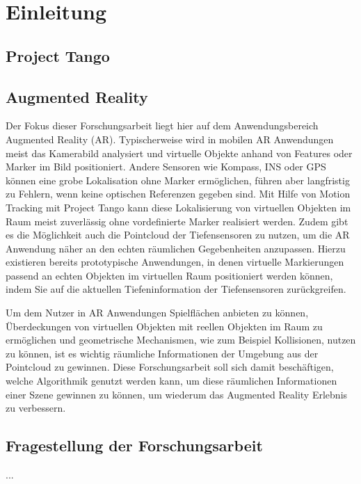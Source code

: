 \chapter{Einleitung}

\section{Project Tango}  \label{sec:project_tango}



\section{Augmented Reality}

Der Fokus dieser Forschungsarbeit liegt hier auf dem Anwendungsbereich Augmented Reality (AR). Typischerweise wird in mobilen AR Anwendungen meist das Kamerabild analysiert und virtuelle Objekte anhand von Features oder Marker im Bild positioniert. Andere Sensoren wie Kompass, INS oder GPS können eine grobe Lokalisation ohne Marker ermöglichen, führen aber langfristig zu Fehlern, wenn keine optischen Referenzen gegeben sind. Mit Hilfe von Motion Tracking mit Project Tango kann diese Lokalisierung von virtuellen Objekten im Raum meist zuverlässig ohne vordefinierte Marker realisiert werden. Zudem gibt es die Möglichkeit auch die Pointcloud der Tiefensensoren zu nutzen, um die AR Anwendung näher an den echten räumlichen Gegebenheiten anzupassen. Hierzu existieren bereits prototypische Anwendungen, in denen virtuelle Markierungen passend an echten Objekten im virtuellen Raum positioniert werden können, indem Sie auf die aktuellen Tiefeninformation der Tiefensensoren zurückgreifen.

Um dem Nutzer in AR Anwendungen Spielflächen anbieten zu können, Überdeckungen von virtuellen Objekten mit reellen Objekten im Raum zu ermöglichen und geometrische Mechanismen, wie zum Beispiel Kollisionen, nutzen zu können, ist es wichtig räumliche Informationen der Umgebung aus der Pointcloud zu gewinnen. Diese Forschungsarbeit soll sich damit beschäftigen, welche Algorithmik genutzt werden kann, um diese räumlichen Informationen einer Szene gewinnen zu können, um wiederum das Augmented Reality Erlebnis zu verbessern. 

\section{Fragestellung der Forschungsarbeit}

...

